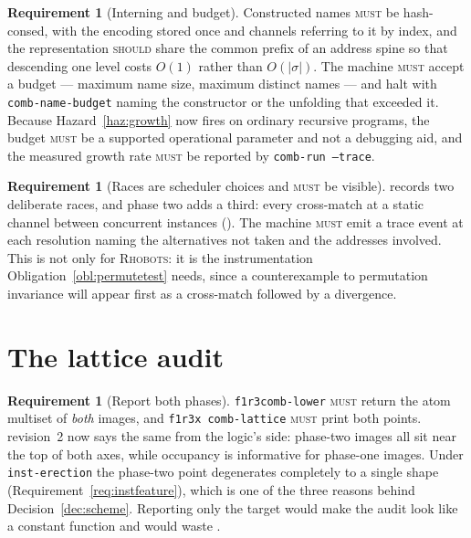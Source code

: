 \documentclass[11pt,a4paper]{article}
\newcommand{\code}[1]{\texttt{#1}}
\newcommand{\Rhobots}{\textsc{Rhobots}}
\newcommand{\MUST}{\textsc{must}}
\newcommand{\SHOULD}{\textsc{should}}
\theoremstyle{definition}
\newtheorem{requirement}[definition]{Requirement}
\theoremstyle{plain}
\begin{document}
\begin{requirement}[Interning and budget]\label{req:intern}
Constructed names \MUST{} be hash-consed, with the encoding stored once and
channels referring to it by index, and the representation \SHOULD{} share the
common prefix of an address spine so that descending one level costs $O(1)$
rather than $O(|\sigma|)$. The machine \MUST{} accept a budget --- maximum
name size, maximum distinct names --- and halt with
\code{comb-name-budget} naming the constructor or the unfolding that exceeded
it. Because Hazard~\ref{haz:growth} now fires on ordinary recursive programs,
the budget \MUST{} be a supported operational parameter and not a debugging
aid, and the measured growth rate \MUST{} be reported by
\code{comb-run --trace}.
\end{requirement}

\begin{requirement}[Races are scheduler choices and \MUST{} be visible]
\label{req:races}
\cite[\S3.3]{draft3} records two deliberate races, and phase two adds a third:
every cross-match at a static channel between concurrent instances
(\cite[Rem.~6.10]{draft3}). The machine \MUST{} emit a trace event at each
resolution naming the alternatives not taken and the addresses involved. This
is not only for \Rhobots: it is the instrumentation
Obligation~\ref{obl:permutetest} needs, since a counterexample to permutation
invariance will appear first as a cross-match followed by a divergence.
\end{requirement}

\section{The lattice audit}\label{sec:lattice}

\begin{requirement}[Report both phases]\label{req:lattice}
\code{f1r3comb-lower} \MUST{} return the atom multiset of \emph{both} images,
and \code{f1r3x comb-lattice} \MUST{} print both points. \cite{logic} revision~2 now says the same
from the logic's side: phase-two images all sit near the top of both axes,
while occupancy is informative for phase-one images. Under
\code{inst-erection} the phase-two point degenerates completely to a single
shape (Requirement~\ref{req:instfeature}), which is one of the three reasons
behind Decision~\ref{dec:scheme}. Reporting only the target would make the
audit look like a constant function and would waste
\cite[Thm.~6.5]{logic}.
\end{requirement}
\end{document}
